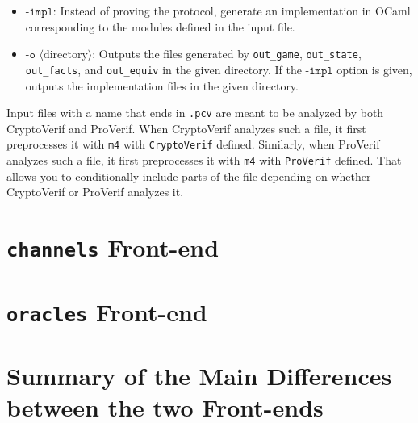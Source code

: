 \documentclass{article}
\newcommand{\nonterm}[1]{\langle\textrm{#1}\rangle}
\begin{document}
\begin{itemize}
\item $\texttt{-impl}$: Instead of proving the protocol, generate an
  implementation in OCaml corresponding to the modules defined in the input
  file.

\item $\texttt{-o }\nonterm{directory}$:
  Outputs the files generated by \texttt{out\_game}, \texttt{out\_state},
  \texttt{out\_facts}, and \texttt{out\_equiv} in the given directory.
  If the $\texttt{-impl}$ option
  is given, outputs the implementation files in the given directory.

\end{itemize}
Input files with a name that ends in \texttt{.pcv} are meant to
be analyzed by both CryptoVerif and ProVerif. When CryptoVerif
analyzes such a file, it first preprocesses it with \texttt{m4}
with \texttt{CryptoVerif} defined. Similarly, when ProVerif
analyzes such a file, it first preprocesses it with \texttt{m4}
with \texttt{ProVerif} defined. That allows you to conditionally
include parts of the file depending on whether CryptoVerif
or ProVerif analyzes it.

\newif\ifchannels

\section{\texttt{channels} Front-end}\label{sec:channels}

\channelstrue


\section{\texttt{oracles} Front-end}\label{sec:oracles}

\channelsfalse


\section{Summary of the Main Differences between the two Front-ends}
\end{document}
